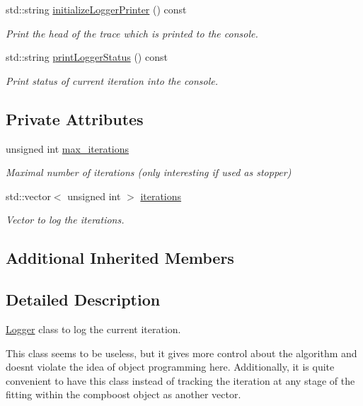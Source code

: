\begin{DoxyCompactItemize}
std\+::string \mbox{\hyperlink{classlogger_1_1_logger_iteration_a051c69a2577e023160ec8ccd080dd59f}{initialize\+Logger\+Printer}} () const
\begin{DoxyCompactList}\small\item\em Print the head of the trace which is printed to the console. \end{DoxyCompactList}\item 
std\+::string \mbox{\hyperlink{classlogger_1_1_logger_iteration_ac6283092f495a6e8c5ab357ae84cb911}{print\+Logger\+Status}} () const
\begin{DoxyCompactList}\small\item\em Print status of current iteration into the console. \end{DoxyCompactList}\end{DoxyCompactItemize}
\subsection*{Private Attributes}
\begin{DoxyCompactItemize}
\item 
unsigned int \mbox{\hyperlink{classlogger_1_1_logger_iteration_a30cfbf3c8c363807826b754f19195c44}{max\+\_\+iterations}}
\begin{DoxyCompactList}\small\item\em Maximal number of iterations (only interesting if used as stopper) \end{DoxyCompactList}\item 
std\+::vector$<$ unsigned int $>$ \mbox{\hyperlink{classlogger_1_1_logger_iteration_a3879ea4e72c8626df033b5345e392fd9}{iterations}}
\begin{DoxyCompactList}\small\item\em Vector to log the iterations. \end{DoxyCompactList}\end{DoxyCompactItemize}
\subsection*{Additional Inherited Members}


\subsection{Detailed Description}
\mbox{\hyperlink{classlogger_1_1_logger}{Logger}} class to log the current iteration. 

This class seems to be useless, but it gives more control about the algorithm and doesn\textquotesingle{}t violate the idea of object programming here. Additionally, it is quite convenient to have this class instead of tracking the iteration at any stage of the fitting within the compboost object as another vector. 

